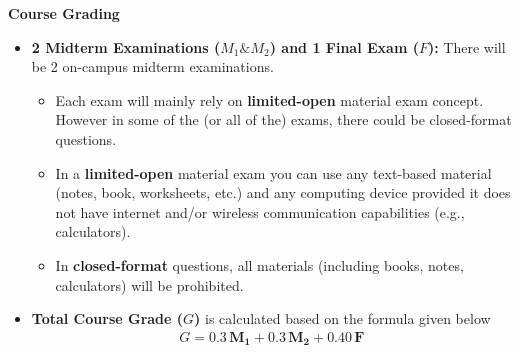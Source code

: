\documentclass[11pt,oneside]{amsart}
\newcommand{\header}[1]{\bigbreak\textbf{#1}}
\begin{document}
\header{Course Grading}

\begin{itemize}

\item \textbf{2 Midterm Examinations ($M_1 \& M_2$) and 1 Final Exam ($F$):} There
  will be 2 on-campus midterm examinations. 

\vspace{3pt}

\begin{itemize}

\item Each exam will mainly rely on \textbf{limited-open} material
  exam concept. However in some of the (or all of the) exams, there
  could be closed-format questions.

\item In a \textbf{limited-open} material exam you can
use any text-based material (notes, book, worksheets, etc.) and any computing
device provided it does not have internet and/or wireless communication capabilities 
(e.g., calculators).

\item In \textbf{closed-format} questions, all materials (including
 books, notes, calculators) will be prohibited. 

\end{itemize}

\vspace{6pt}

\item \textbf{Total Course Grade ($G$)} is calculated based on the
  formula given below
%
\begin{align*}
  G = 0.3 \, \mathbf{M_1} + 0.3 \, \mathbf{M_2} + 0.40 \, \mathbf{F} 
\end{align*}

\end{itemize}
\end{document}
